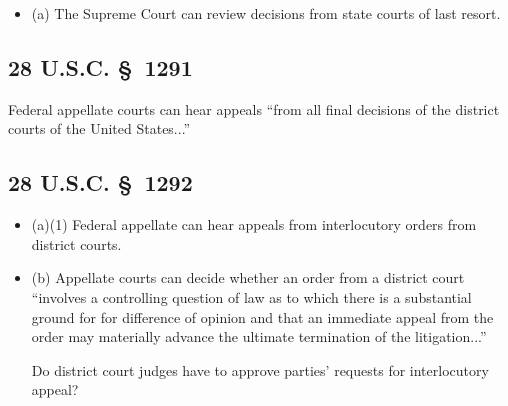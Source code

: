 \begin{itemize}
    \item (a) The Supreme Court can review decisions from state courts of last 
    resort.
\end{itemize}

\subsection{28 U.S.C. \S\ 1291}

Federal appellate courts can hear appeals ``from all final decisions of the 
district courts of the United States...''

\subsection{28 U.S.C. \S\ 1292}

\begin{itemize}
    \item (a)(1) Federal appellate can hear appeals from interlocutory orders 
    from district courts.
    \item (b) Appellate courts can decide whether an order from a district 
    court ``involves a controlling question of law as to which there is a 
    substantial ground for for difference of opinion and that an immediate 
    appeal from the order may materially advance the ultimate termination of 
    the litigation...''
    \item [Do district court judges have to approve parties' requests for 
    interlocutory appeal?]
\end{itemize}
